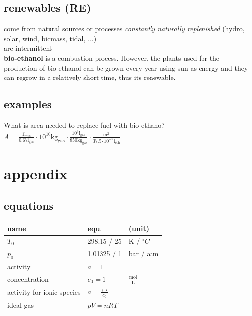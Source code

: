 \documentclass[a4paper,10pt,landscape]{scrartcl}
\begin{document}
\begin{multicols*}{3}
\subsection{renewables (RE)}
come from natural sources or processes \textit{constantly naturally replenished} (hydro, solar, wind, biomass, tidal, ...) \\
are intermittent \\
\textbf{ bio-ethanol} is a combustion process. However, the plants used for the production of bio-ethanol can be grown every year using sun as energy and they can regrow in a relatively short time, thus its renewable.

\subsection{examples}
What is area needed to replace fuel with bio-ethano?
$A=\mathrm{\frac{1 l_{eth}}{0.67 l_{gas}}\cdot 10^{10} kg_{gas}\cdot\frac{10^3 l_{gas}}{850 kg_{gas}}\cdot\frac{m^2}{37.5\cdot10^{-2}l_{eth}}}$



\section{appendix}
\subsection{equations}
\noindent
\begin{tabular}{|p{2cm}|p{4.5cm}|p{1.5cm}|}
\textbf{name} & \textbf{equ.} & \textbf{(unit)} \\
\hline
$T_0$ & 298.15 / 25 & K / $^\circ C$ \\
$p_0$ &  1.01325 / 1 & bar / atm \\
activity &  $a=1$ & \\
concentration & $c_0=1$ & $\frac{\text{mol}}{\text{L}}$ \\
activity for ionic species & $a=\frac{\gamma\cdot c}{c_0}$ & \\
ideal gas & $pV=nRT$ & \\

\end{tabular}


\end{multicols*}
\end{document}
